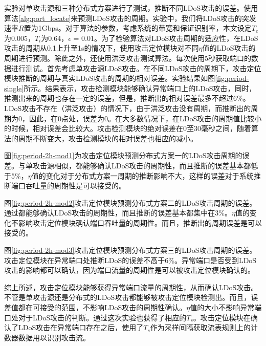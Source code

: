 实验对单攻击源和三种分布式方案进行了测试，推断不同LDoS攻击的误差。使用算法\ref{alg:port_locate}来预测LDoS攻击的周期。实验中，我们将LDoS攻击的突发速率$R$置为1Gbps。对于算法的参数，考虑系统的带宽和保证识别率，本文设定$T_e$为0.005，$T_i$为0.64，$\epsilon$ = 0.01。为了检验算法对LDoS攻击周期的适应性，在LDoS攻击的周期从0.1上升至1s的情况下，使用攻击定位模块对不同$\eta$值的LDoS攻击的周期进行预测。除此之外，还使用洪泛攻击测试算法。每次使用5秒获取端口的数据进行测试。首先考虑单攻击源LDoS攻击。在不同LDoS攻击的周期下，攻击定位模块推断的周期与真实LDoS攻击的周期的相对误差。实验结果如图\ref{fig:period-single}所示。结果表示，攻击检测模块能够确认异常端口上的LDoS攻击，同时，推测出来的周期也存在一定的误差，但是，推断出的相对误差最多不超过6\%。LDoS攻击不存在（洪泛攻击）的情况下，由于洪泛攻击没有周期，而推断出的周期为0，因此，在0点处，误差为0。在大多数情况下，在LDoS攻击的周期值比较小的时候，相对误差会比较大。攻击检测模块的绝对误差在0至30毫秒之间，随着算法的周期不断变大，攻击检测模块的相对误差也相应的减小。

图\ref{fig:period-2h-mod1}为攻击定位模块预测分布式方案一的LDoS攻击周期的误差。与单攻击源相似，都能够确认LDoS攻击的周期性，而且推断的误差基本都低于5\%，$\eta$值的变化对于分布式方案一周期的推断影响不大，这样的误差对于系统推断端口吞吐量的周期性是可以接受的。

图\ref{fig:period-2h-mod2}攻击定位模块预测分布式方案二的LDoS攻击周期的误差。通过都能够确认LDoS攻击的周期性，而且推断的误差基本都集中在3\%。$\eta$值的变化不影响攻击定位模块确认端口吞吐量的周期性。而且，推断出的周期误差是可以接受的。

图\ref{fig:period-2h-mod3}攻击定位模块预测分布式方案三的LDoS攻击周期的误差。攻击定位模块在异常端口处推断LDoS的误差不高于6\%。异常端口是否受到LDoS攻击的影响都可以确认，因为端口流量的周期性是可以被攻击定位模块确认的。

综上所述，攻击定位模块能够获得异常端口流量的周期性，从而确认LDoS攻击。不管是单攻击源还是分布式的LDoS攻击都能够被攻击定位模块检测出。而且，误差值都在可接受的范围，不影响LDoS攻击的周期性确认。$\eta$值的大小不影响异常端口处对于LDoS攻击的判断。通过这次实验也获得了相应的$T_s$。攻击定位模块在确认了LDoS攻击在异常端口存在之后，使用了$T_s$作为采样间隔获取流表规则上的计数器数据用以识别攻击流。

